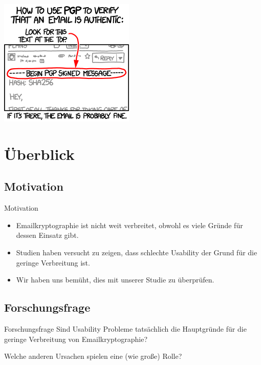 \documentclass[]{beamer}
\begin{document}
\begin{frame}
	\titlepage
\end{frame}


\begin{frame}
	\begin{center}
		\includegraphics[scale=0.7]{pic/pgp.png}
	\end{center}
\end{frame}

\section{Überblick}

\subsection{Motivation}
\begin{frame}{Motivation}
\begin{itemize}
	\item Emailkryptographie ist nicht weit verbreitet, obwohl es viele Gründe für dessen Einsatz gibt.
	\item Studien haben versucht zu zeigen, dass schlechte Usability der Grund für die geringe Verbreitung ist.
	\item Wir haben uns bemüht, dies mit unserer Studie zu überprüfen.
\end{itemize}
\end{frame}


\subsection{Forschungsfrage}
\begin{frame}{Forschungsfrage}
	Sind Usability Probleme tatsächlich die Hauptgründe für die geringe Verbreitung von Email\-kryp\-to\-gra\-phie?

	Welche anderen Ursachen spielen eine (wie große) Rolle?
\end{frame}
\end{document}
